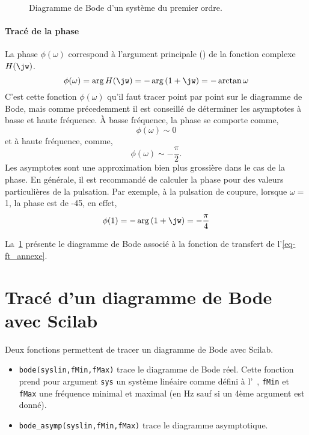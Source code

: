 \begin{figure}[!t]
    \centering
    
    
    \caption{Diagramme de Bode d'un système du premier ordre.
    \label{fig-bode_annexe}}
\end{figure}

\paragraph{Tracé de la phase}
La phase $\phi(\omega)$ correspond à l'argument principale () 
de la fonction complexe $H(\jw)$.
$$
\phi(\omega)=\arg{H(\jw)}=-\arg{(1+\jw)}=-\arctan{\omega}
$$
C'est cette fonction $\phi(\omega)$ qu'il faut tracer point par point 
sur le diagramme de Bode, mais comme précedemment
il est conseillé de déterminer les asymptotes à basse et haute fréquence.
\`A basse fréquence, la phase se comporte comme,
$$
\phi(\omega)\sim 0
$$ 
et à haute fréquence, comme, 
$$
\phi(\omega)\sim -\dfrac{\pi}{2}.
$$
Les asymptotes sont une approximation bien plus 
grossière dans le cas de la phase. 
En générale, il est recommandé de 
calculer la phase pour des valeurs particulières de la 
pulsation. Par exemple, à la pulsation de coupure, 
lorsque $\omega=$1, la phase est de -45\degree, en effet,
$$
\phi(1)=-\arg{(1+\jw)}=-\dfrac{\pi}{4}
$$

La~\cref{fig-bode_annexe} présente le diagramme de Bode associé à 
la fonction de transfert de l'\cref{eq-ft_annexe}.

\section{Tracé d'un diagramme de Bode avec Scilab}
Deux fonctions permettent de tracer un diagramme de Bode avec Scilab.
\begin{itemize}
    \item \verb?bode(syslin,fMin,fMax)? trace le diagramme de Bode réel. 
          Cette fonction prend pour argument \verb?sys? un système linéaire 
          comme défini à l'~, \verb?fMin? et \verb?fMax? 
          une fréquence minimal et maximal (en \si{\hertz} sauf si un 
          4ème argument est donné). 
    \item \verb?bode_asymp(syslin,fMin,fMax)? trace le diagramme asymptotique.
\end{itemize}


